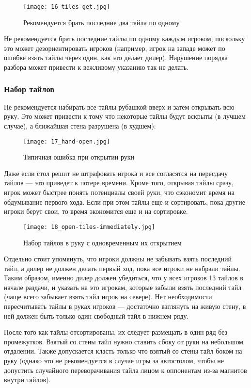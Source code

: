 \begin{figure}[H]
	\centering
	\texttt{[image: 16\_tiles-get.jpg]}
	\caption{Рекомендуется брать последние два тайла по одному}
\end{figure}

Не рекомендуется брать последние тайлы по одному каждым игроком, поскольку это может дезориентировать игроков (например, игрок на западе может по ошибке взять тайлы через один, как это делает дилер). Нарушение порядка разбора может привести к вежливому указанию так не делать.

\subsubsection{Набор тайлов}

Не рекомендуется набирать все тайлы рубашкой вверх и затем открывать всю руку. Это может привести к тому что некоторые тайлы будут вскрыты (в лучшем случае), а ближайшая стена разрушена (в худшем):

\begin{figure}[H]
	\centering
	\texttt{[image: 17\_hand-open.jpg]}
	\caption{Типичная ошибка при открытии руки}
\end{figure}

Даже если стол решит не штрафовать игрока и все согласятся на пересдачу тайлов --- это приведет к потере времени. Кроме того, открывая тайлы сразу, игрок может быстрее понять потенциалы своей руки, что сэкономит время на обдумывание первого хода. Если при этом тайлы еще и сортировать, пока другие игроки берут свои, то время экономится еще и на сортировке.

\begin{figure}[H]
	\centering
	\texttt{[image: 18\_open-tiles-immediately.jpg]}
	\caption{Набор тайлов в руку с одновременным их открытием}
\end{figure}

Отдельно стоит упомянуть, что игроки должны не забывать взять последний тайл, а дилер не должен делать первый ход, пока все игроки не набрали тайлы. Таким образом, именно дилер должен убедиться, что у всех игроков 13 тайлов в начале раздачи, и указать на это игрокам, которые забыли взять последний тайл (чаще всего забывает взять тайл игрок на севере). Нет необходимости пересчитывать тайлы в руках игроков --- достаточно взглянуть на живую стену, в ней должен быть только один свободный тайл в нижнем ряду. 

После того как тайлы отсортированы, их следует размещать в один ряд без промежутков. Взятый со стены тайл нужно ставить сбоку от руки на небольшом отдалении. Также допускается класть только что взятый со стены тайл боком на руку (однако это не рекомендуется в случае игры за автостолом, чтобы не допустить случайного переворачивания тайла лицом к оппонентам из-за магнитов внутри тайлов).

